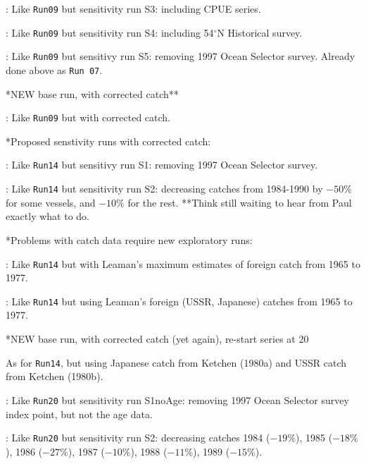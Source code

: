 : Like {\tt Run09} but sensitivity run S3: including CPUE series. \newline

: Like {\tt Run09} but sensitivity run S4: including 54$^\circ$N Historical survey. \newline

: Like {\tt Run09} but sensitivy run S5: removing 1997 Ocean Selector survey. Already done above as {\tt Run 07}. \newline

\noindent **NEW base run, with corrected catch**

: Like {\tt Run09} but with corrected catch.  \newline

\noindent **Proposed senstivity runs with corrected catch:

: Like {\tt Run14} but sensitivy run S1: removing 1997 Ocean Selector survey. \newline

: Like {\tt Run14} but sensitivity run S2: decreasing catches from 1984-1990 by $-50\%$ for some vessels, and $-10\%$ for the rest. **Think still waiting to hear from Paul exactly what to do. \newline

\noindent **Problems with catch data require new exploratory runs:

: Like {\tt Run14} but with Leaman's maximum estimates of foreign catch from 1965 to 1977.  \newline

: Like {\tt Run14} but using Leaman's foreign (USSR, Japanese) catches from 1965 to 1977.  \newline

\noindent **NEW base run, with corrected catch (yet again), re-start series at 20

 As for {\tt Run14}, but using Japanese catch from Ketchen (1980a) and USSR catch from Ketchen (1980b). \newline

: Like {\tt Run20} but sensitivity run S1noAge: removing 1997 Ocean Selector survey index point, but not the age data. \newline

: Like {\tt Run20} but sensitivity run S2: decreasing catches 1984 ($-19\%$), 1985 ($-18\%$), 1986 ($-27\%$), 1987 ($-10\%$), 1988 ($-11\%$), 1989 ($-15\%$). \newline

